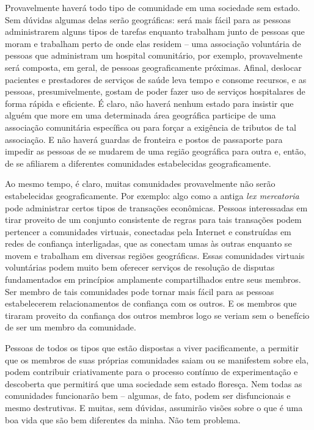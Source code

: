 Provavelmente haverá todo tipo de comunidade em uma sociedade sem estado. Sem dúvidas algumas delas serão geográficas: será mais fácil para as pessoas administrarem alguns tipos de tarefas enquanto trabalham junto de pessoas que moram e trabalham perto de onde elas residem -- uma associação voluntária de pessoas que administram um hospital comunitário, por exemplo, provavelmente será composta, em geral, de pessoas geograficamente próximas. Afinal, deslocar pacientes e prestadores de serviços de saúde leva tempo e consome recursos, e as pessoas, presumivelmente, gostam de poder fazer uso de serviços hospitalares de forma rápida e eficiente. É claro, não haverá nenhum estado para insistir que alguém que more em uma determinada área geográfica participe de uma associação comunitária específica ou para forçar a exigência de tributos de tal associação. E não haverá guardas de fronteira e postos de passaporte para impedir as pessoas de se mudarem de uma região geográfica para outra e, então, de se afiliarem a diferentes comunidades estabelecidas geograficamente.

Ao mesmo tempo, é claro, muitas comunidades provavelmente não serão estabelecidas geograficamente. Por exemplo: algo como a antiga \emph{lex mercatoria} pode administrar certos tipos de transações econômicas. Pessoas interessadas em tirar proveito de um conjunto consistente de regras para tais transações podem pertencer a comunidades virtuais, conectadas pela Internet e construídas em redes de confiança interligadas, que as conectam umas às outras enquanto se movem e trabalham em diversas regiões geográficas. Essas comunidades virtuais voluntárias podem muito bem oferecer serviços de resolução de disputas fundamentados em princípios amplamente compartilhados entre seus membros. Ser membro de tais comunidades pode tornar mais fácil para as pessoas estabelecerem relacionamentos de confiança com os outros. E os membros que tiraram proveito da confiança dos outros membros logo se veriam sem o benefício de ser um membro da comunidade.

Pessoas de todos os tipos que estão dispostas a viver pacificamente, a permitir que os membros de suas próprias comunidades saiam ou se manifestem sobre ela, podem contribuir criativamente para o processo contínuo de experimentação e descoberta que permitirá que uma sociedade sem estado floresça. Nem todas as comunidades funcionarão bem -- algumas, de fato, podem ser disfuncionais e mesmo destrutivas. E muitas, sem dúvidas, assumirão visões sobre o que é uma boa vida que são bem diferentes da minha. Não tem problema. 

